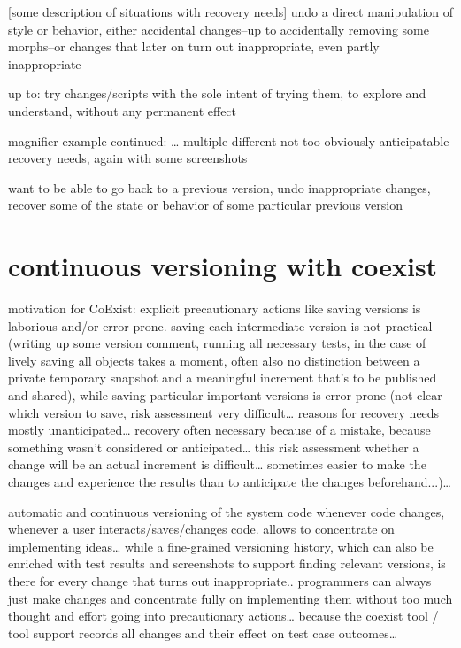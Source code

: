 [some description of situations with recovery needs]
undo a direct manipulation of style or behavior, either accidental changes–up to accidentally removing some morphs–or changes that later on turn out inappropriate, even partly inappropriate

up to: try changes/scripts with the sole intent of trying them, to explore and understand, without any permanent effect

magnifier example continued: … multiple different not too obviously anticipatable recovery needs, again with some screenshots

want to be able to go back to a previous version, undo inappropriate changes, recover some of the state or behavior of some particular previous version



\section{continuous versioning with coexist}

motivation for CoExist: explicit precautionary actions like saving versions is laborious and/or error-prone. saving each intermediate version is not practical (writing up some version comment, running all necessary tests, in the case of lively saving all objects takes a moment, often also no distinction between a private temporary snapshot and a meaningful increment that’s to be published and shared), while saving particular important versions is error-prone (not clear which version to save, risk assessment very difficult… reasons for recovery needs mostly unanticipated… recovery often necessary because of a mistake, because something wasn’t considered or anticipated… this risk assessment whether a change will be an actual increment is difficult… sometimes easier to make the changes and experience the results than to anticipate the changes beforehand...)… 


automatic and continuous versioning of the system code whenever code changes, whenever a user interacts/saves/changes code.
allows to concentrate on implementing ideas… while a fine-grained versioning history, which can also be enriched with test results and screenshots to support finding relevant versions, is there for every change that turns out inappropriate.. programmers can always just make changes and concentrate fully on implementing them without too much thought and effort going into precautionary actions… because the coexist tool / tool support records all changes and their effect on test case outcomes… 



